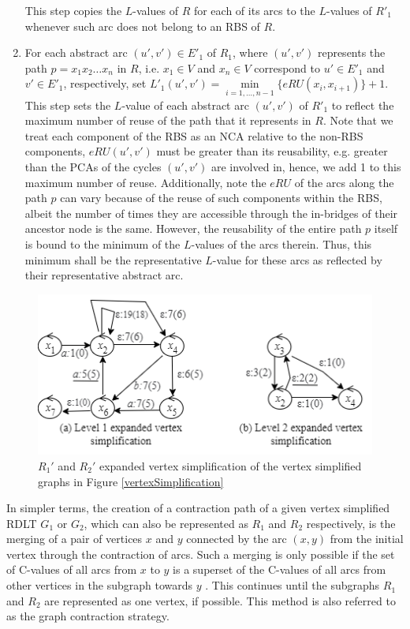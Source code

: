 \begin{algorithm}
\begin{enumerate}
        This step copies the $L$-values of $R$ for each of its arcs to the $L$-values of $R'_1$ whenever such arc does not belong to an RBS of $R$. 
        
        \item For each abstract arc $(u',v') \in E'_1$ of $R_1$, where $(u',v')$ represents the path \mbox{$p = x_1 x_2 \ldots x_n$} in $R$, i.e. $x_1 \in V$ and $x_n \in V$ correspond to $u' \in E'_1$ and  $v' \in E'_1$, respectively, set $L'_1(u',v') = \min\limits_{i = 1, \ldots, n-1} \{eRU(x_i, x_{i+1})\} + 1$. \\
        
        This step sets the $L$-value  of each abstract arc $(u',v')$ of $R'_1$ to reflect the maximum number of reuse of the path that it represents in $R$. Note that we treat each component of the RBS as an NCA relative to the non-RBS components, $eRU(u',v')$ must be greater than its reusability, e.g. greater than the PCAs of the cycles $(u',v')$ are involved in, hence, we add 1 to this maximum number of reuse. Additionally, note the $eRU$ of the arcs along the path $p$ can vary because of the reuse of such components within the RBS, albeit the number of times they are accessible through the in-bridges of their ancestor node is the same. However, the reusability of the entire path $p$ itself is bound to the minimum of the $L$-values of the arcs therein. Thus, this minimum shall be the representative $L$-value for these arcs as reflected by their representative abstract arc.
    \end{enumerate}
\end{algorithm}

\begin{figure}[H]
    \centering
    \includegraphics{../Figures/expandedVertexSimplification.png}
    \caption{$R_1'$ and $R_2'$ expanded vertex simplification of the vertex simplified graphs in Figure \ref{vertexSimplification}}
    \label{expandedVertexSimplifiedRLDTs}
\end{figure}
In simpler terms, the creation of a contraction path of a given vertex simplified RDLT $ G_1 $ or $ G_2 $, which can also be represented as $R_1$ and $R_2$ respectively, is the merging of a pair of vertices $ x $ and $ y $ connected by the arc $ (x,y) $ from the initial vertex through the contraction of arcs. Such a merging is only possible if the set of C-values of all arcs from $ x $ to $ y $ is a superset of the C-values of all arcs from other vertices in the subgraph towards $ y $ \cite{MalinaoWCTP2023}. This continues until the subgraphs $ R_1 $ and $ R_2 $ are represented as one vertex, if possible. This method is also referred to as the graph contraction strategy.

